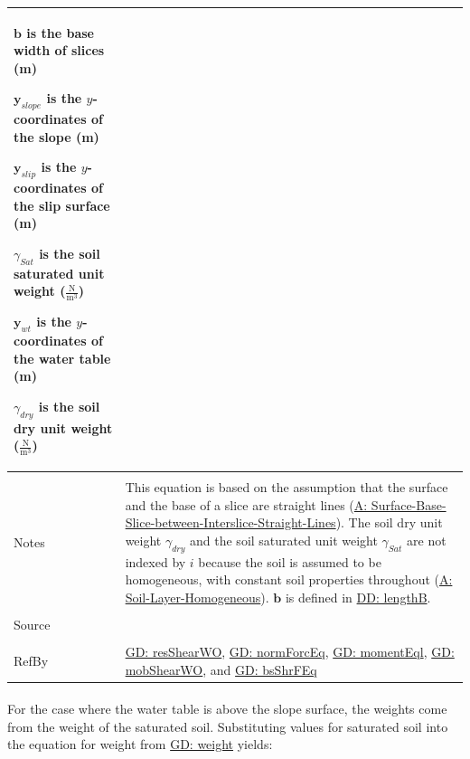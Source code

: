 \documentclass[12pt]{article}
\begin{document}
\begin{minipage}{\textwidth}
\begin{tabular}{>{\raggedright}p{}>{\raggedright\arraybackslash}p{}}
\begin{symbDescription}
              \item{$\mathbf{b}$ is the base width of slices (m)}
              \item{${\mathbf{y}_{slope}}$ is the $y$-coordinates of the slope (m)}
              \item{${\mathbf{y}_{slip}}$ is the $y$-coordinates of the slip surface (m)}
              \item{${γ_{Sat}}$ is the soil saturated unit weight ($\frac{\text{N}}{\text{m}^{3}}$)}
              \item{${\mathbf{y}_{wt}}$ is the $y$-coordinates of the water table (m)}
              \item{${γ_{dry}}$ is the soil dry unit weight ($\frac{\text{N}}{\text{m}^{3}}$)}
              \end{symbDescription}
\\ \midrule \\
Notes & This equation is based on the assumption that the surface and the base of a slice are straight lines (\hyperref[assumpSBSBISL]{A: Surface-Base-Slice-between-Interslice-Straight-Lines}). The soil dry unit weight ${γ_{dry}}$ and the soil saturated unit weight ${γ_{Sat}}$ are not indexed by $i$ because the soil is assumed to be homogeneous, with constant soil properties throughout (\hyperref[assumpSLH]{A: Soil-Layer-Homogeneous}). $\mathbf{b}$ is defined in \hyperref[DD:lengthB]{DD: lengthB}.
        
\\ \midrule \\
Source & \cite{fredlund1977}
         
\\ \midrule \\
RefBy & \hyperref[GD:resShearWO]{GD: resShearWO}, \hyperref[GD:normForcEq]{GD: normForcEq}, \hyperref[GD:momentEql]{GD: momentEql}, \hyperref[GD:mobShearWO]{GD: mobShearWO}, and \hyperref[GD:bsShrFEq]{GD: bsShrFEq}
        
\\ \bottomrule
\end{tabular}
\end{minipage}
\paragraph{}
\label{GD:sliceWghtDeriv}
For the case where the water table is above the slope surface, the weights come from the weight of the saturated soil. Substituting values for saturated soil into the equation for weight from \hyperref[GD:weight]{GD: weight} yields:
\end{document}

